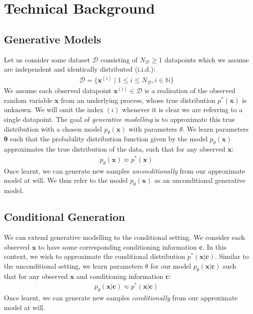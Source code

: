 \documentclass[ oneside,%
                    author={George Herbert},
                    degree={MSci},
                     title={Diffusion Models for Time-Evolving Precipitation Fields},
                  subtitle={}]{dissertation}
\begin{document}
\chapter{Technical Background}
\label{chap:background}

\section{Generative Models}
\label{sec:background_generative}

Let us consider some dataset $\mathcal{D}$ consisting of $N_{\mathcal{D}}\ge1$ datapoints which we assume are independent and identically distributed (i.i.d.):
\begin{align}
      \mathcal{D}=\{\mathbf{x}^{(i)}\mid 1 \le i \le N_{\mathcal{D}}, i \in \mathbb{N} \}
\end{align}
We assume each observed datapoint $\mathbf{x}^{(i)}\in\mathcal{D}$ is a realisation of the observed random variable $\mathbf{x}$ from an underlying process, whose true distribution $p^*(\mathbf{x})$ is unknown. We will omit the index $(i)$ whenever it is clear we are referring to a single datapoint. The goal of \textit{generative modelling} is to approximate this true distribution with a chosen model $p_\theta(\mathbf{x})$ with parameters $\theta$. We learn parameters $\mathbf{\theta}$ such that the probability distribution function given by the model $p_\theta(\mathbf{x})$ approximates the true distribution of the data, such that for any observed $\mathbf{x}$:
\begin{align}
      p_\theta(\mathbf{x}) \approx p^*(\mathbf{x})
\end{align}
Once learnt, we can generate new samples \textit{unconditionally} from our approximate model at will. We thus refer to the model $p_\theta(\mathbf{x})$ as an unconditional generative model.

\section{Conditional Generation}
\label{sec:background_conditional}

We can extend generative modelling to the conditional setting. We consider each observed $\mathbf{x}$ to have some corresponding conditioning information $\mathbf{c}$. In this context, we wish to approximate the conditional distribution $p^*(\mathbf{x}|\mathbf{c})$. Similar to the unconditional setting, we learn parameters $\theta$ for our model $p_\theta(\mathbf{x}|\mathbf{c})$ such that for any observed $\mathbf{x}$ and conditioning information $\mathbf{c}$:
\begin{align}
      p_\theta(\mathbf{x}|\mathbf{c})\approx p^*(\mathbf{x}|\mathbf{c})
\end{align}
Once learnt, we can generate new samples \textit{conditionally} from our approximate model at will.
\end{document}
